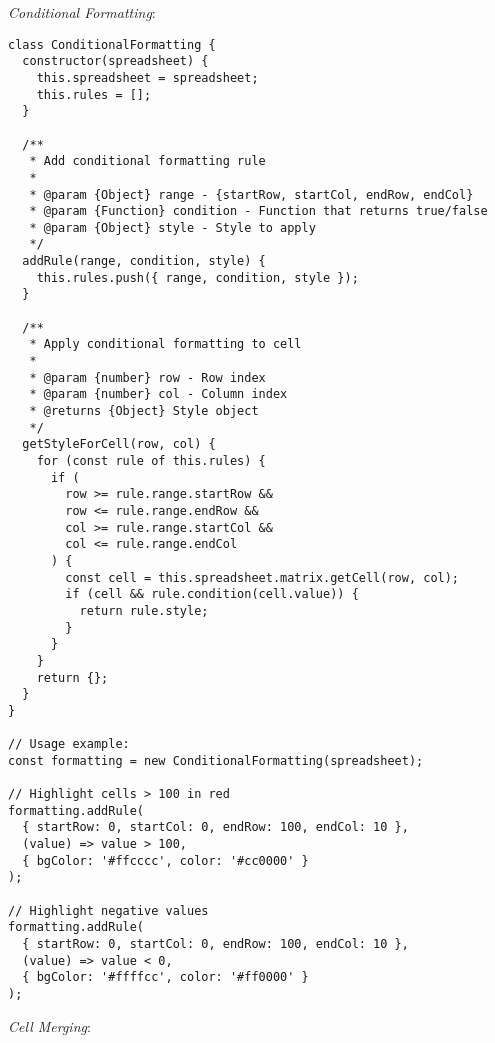 \documentclass[11pt]{article}
\begin{document}
\emph{Conditional Formatting}:

\begin{verbatim}
class ConditionalFormatting {
  constructor(spreadsheet) {
    this.spreadsheet = spreadsheet;
    this.rules = [];
  }
  
  /**
   * Add conditional formatting rule
   * 
   * @param {Object} range - {startRow, startCol, endRow, endCol}
   * @param {Function} condition - Function that returns true/false
   * @param {Object} style - Style to apply
   */
  addRule(range, condition, style) {
    this.rules.push({ range, condition, style });
  }
  
  /**
   * Apply conditional formatting to cell
   * 
   * @param {number} row - Row index
   * @param {number} col - Column index
   * @returns {Object} Style object
   */
  getStyleForCell(row, col) {
    for (const rule of this.rules) {
      if (
        row >= rule.range.startRow &&
        row <= rule.range.endRow &&
        col >= rule.range.startCol &&
        col <= rule.range.endCol
      ) {
        const cell = this.spreadsheet.matrix.getCell(row, col);
        if (cell && rule.condition(cell.value)) {
          return rule.style;
        }
      }
    }
    return {};
  }
}

// Usage example:
const formatting = new ConditionalFormatting(spreadsheet);

// Highlight cells > 100 in red
formatting.addRule(
  { startRow: 0, startCol: 0, endRow: 100, endCol: 10 },
  (value) => value > 100,
  { bgColor: '#ffcccc', color: '#cc0000' }
);

// Highlight negative values
formatting.addRule(
  { startRow: 0, startCol: 0, endRow: 100, endCol: 10 },
  (value) => value < 0,
  { bgColor: '#ffffcc', color: '#ff0000' }
);
\end{verbatim}

\emph{Cell Merging}:
\end{document}
